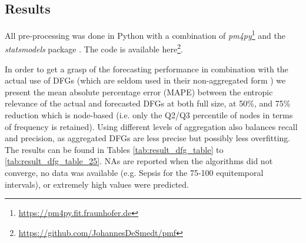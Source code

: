 
\subsection{Results}\label{sec:4.3:results}
All pre-processing was done in Python with a combination of \emph{pm4py}\footnote{\url{https://pm4py.fit.fraunhofer.de}} and the \emph{statsmodels} package \cite{seabold2010statsmodels}. 
The code is available here\footnote{\url{https://github.com/JohannesDeSmedt/pmf}}.

In order to get a grasp of the forecasting performance in combination with the actual use of DFGs (which are seldom used in their non-aggregated form \cite{van2019practitioner}) we present the mean absolute percentage error (MAPE) between the entropic relevance of the actual and forecasted DFGs at both full size, at 50\%, and 75\% reduction which is node-based (i.e. only the Q2/Q3 percentile of nodes in terms of frequency is retained).
Using different levels of aggregation also balances recall and precision, as aggregated DFGs are less precise but possibly less overfitting.
The results can be found in Tables \ref{tab:result_dfg_table} to \ref{tab:result_dfg_table_25}.
NAs are reported when the algorithms did not converge, no data was available (e.g. Sepsis for the 75-100 equitemporal intervals), or extremely high values were predicted.

